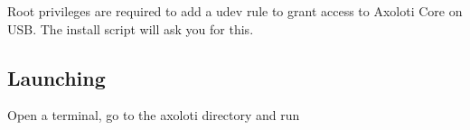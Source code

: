 Root privileges are required to add a udev rule to grant access to Axoloti Core on U\+SB. The install script will ask you for this.\hypertarget{compile_compile_on_linux_launching}{}\subsection{Launching}\label{compile_compile_on_linux_launching}
Open a terminal, go to the axoloti directory and run 
 